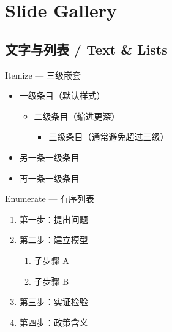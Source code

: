 %      

\section{Slide Gallery}

\subsection{文字与列表 / Text \& Lists}

\begin{frame}{Itemize — 三级嵌套}
  \begin{itemize}
    \item 一级条目（默认样式）
      \begin{itemize}
        \item 二级条目（缩进更深）
          \begin{itemize}
            \item 三级条目（通常避免超过三级）
          \end{itemize}
      \end{itemize}
    \item 另一条一级条目
    \item 再一条一级条目
  \end{itemize}
\end{frame}

\begin{frame}{Enumerate — 有序列表}
  \begin{enumerate}
    \item 第一步：提出问题
    \item 第二步：建立模型
      \begin{enumerate}
        \item 子步骤 A
        \item 子步骤 B
      \end{enumerate}
    \item 第三步：实证检验
    \item 第四步：政策含义
  \end{enumerate}
\end{frame}

